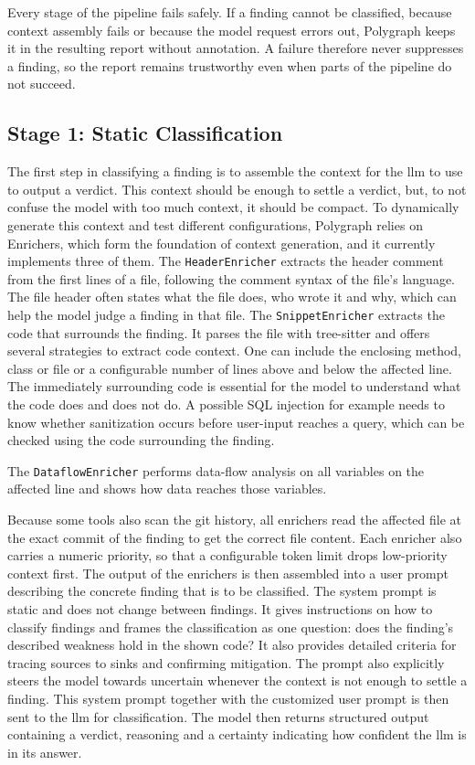 Every stage of the pipeline fails safely. If a finding cannot be classified, because context assembly fails or because the model request errors out, Polygraph keeps it in the resulting report without annotation. A failure therefore never suppresses a finding, so the report remains trustworthy even when parts of the pipeline do not succeed.

\subsection{Stage 1: Static Classification}

The first step in classifying a finding is to assemble the context for the \ac{llm} to use to output a verdict.
This context should be enough to settle a verdict, but, to not confuse the model with too much context, it should be compact. To dynamically generate this context and test different configurations, Polygraph relies on Enrichers, which form the foundation of context generation, and it currently implements three of them. The \texttt{HeaderEnricher} extracts the header comment from the first lines of a file, following the comment syntax of the file's language. The file header often states what the file does, who wrote it and why, which can help the model judge a finding in that file. The \texttt{SnippetEnricher} extracts the code that surrounds the finding. It parses the file with tree-sitter and offers several strategies to extract code context. One can include the enclosing method, class or file or a configurable number of lines above and below the affected line.
The immediately surrounding code is essential for the model to understand what the code does and does not do. A possible SQL injection for example needs to know whether sanitization occurs before user-input reaches a query, which can be checked using the code surrounding the finding.

The \texttt{DataflowEnricher} performs data-flow analysis on all variables on the affected line and shows how data reaches those variables.

Because some tools also scan the git history, all enrichers read the affected file at the exact commit of the finding to get the correct file content. Each enricher also carries a numeric priority, so that a configurable token limit drops low-priority context first. The output of the enrichers is then assembled into a user prompt describing the concrete finding that is to be classified.
The system prompt is static and does not change between findings. It gives instructions on how to classify findings and frames the classification as one question: does the finding's described weakness hold in the shown code? It also provides detailed criteria for tracing sources to sinks and confirming mitigation. The prompt also explicitly steers the model towards uncertain whenever the context is not enough to settle a finding.
This system prompt together with the customized user prompt is then sent to the \ac{llm} for classification. The model then returns structured output containing a verdict, reasoning and a certainty indicating how confident the \ac{llm} is in its answer.

